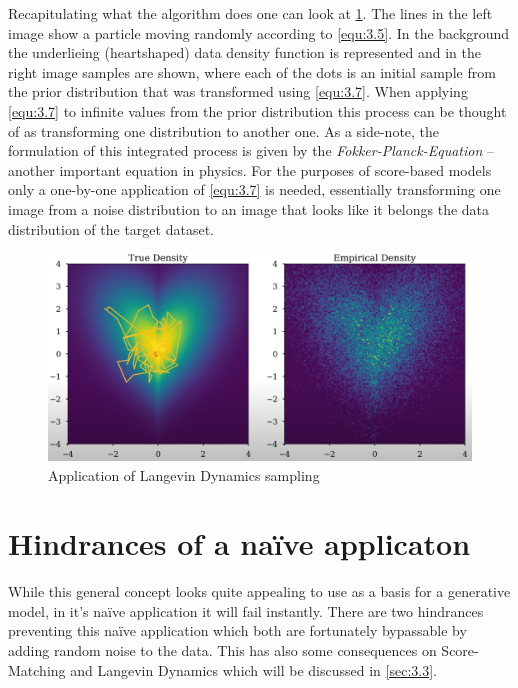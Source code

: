 Recapitulating what the algorithm does one can look at \cref{fig:3.1}. The lines in the left image show a particle moving randomly according to \cref{equ:3.5}. In the background the underlieing (heartshaped) data density function  is represented and in the right image samples are shown, where each of the dots is an initial sample from the prior distribution that was transformed using \cref{equ:3.7}. When applying \cref{equ:3.7} to infinite values from the prior distribution this process can be thought of as transforming one distribution to another one. As a side-note, the formulation of this integrated process is given by the \textit{Fokker-Planck-Equation} – another important equation in physics. For the purposes of score-based models only a one-by-one application of \cref{equ:3.7} is needed, essentially transforming one image from a noise distribution to an image that looks like it belongs the data distribution of the target dataset.
\begin{figure}[] \label{fig:3.1}
\centering
\includegraphics[width=.8\textwidth]{Chapters/figures/langevin.PNG}
\caption[Short-form caption]{Application of Langevin Dynamics sampling}
\end{figure}
%
\section{Hindrances of a na\"{i}ve applicaton}
While this general concept looks quite appealing to use as a basis for a generative model, in it's na\"{i}ve application it will fail instantly. There are two hindrances preventing this na\"{i}ve application which both are fortunately bypassable by adding random noise to the data. This has also some consequences on Score-Matching and Langevin Dynamics which will be discussed in \cref{sec:3.3}.
%
